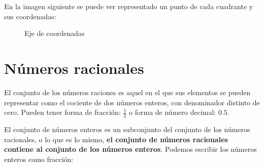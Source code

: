 En la imagen siguiente se puede ver representado un punto de cada cuadrante y sus coordenadas:

\begin{figure}[!ht]
    \begin{center}
    \end{center}
    \caption{Eje de coordenadas}
    \label{fig:eje-coordenadas}
\end{figure}

\section{Números racionales}

El conjunto de los números raciones es aquel en el que sus elementos se pueden representar como el cociente de dos números enteros, con denominador distinto de cero. Pueden tener forma de fracción: $\displaystyle \frac{1}{2}$ o forma de número decimal: $0.5$.

El conjunto de números enteros es un subconjunto del conjunto de los números racionales, o lo que es lo mismo, \textbf{el conjunto de números racionales contiene al conjunto de los números enteros}. Podemos escribir los números enteros como fracción:

